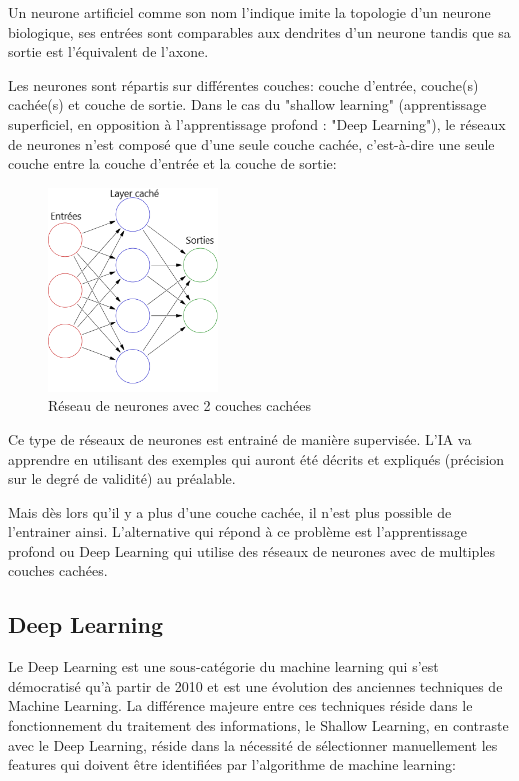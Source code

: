             Un neurone artificiel comme son nom l'indique imite la topologie d'un neurone biologique,
            ses entrées sont comparables aux dendrites d'un neurone tandis que sa
            sortie est l'équivalent de l'axone. \newline

            Les neurones sont répartis sur différentes couches: couche d'entrée, couche(s) cachée(s)
            et couche de sortie. Dans le cas du "shallow learning" (apprentissage superficiel,
            en opposition à l'apprentissage profond : "Deep Learning"), le réseaux de neurones
            n'est composé que d'une seule couche cachée, c'est-à-dire une seule couche entre
            la couche d'entrée et la couche de sortie:

            \begin{figure}[H]
                \centering
                \includegraphics[width=0.4\textwidth]{Images/shallownnoverview}
                \caption{Réseau de neurones avec 2 couches cachées}
                \label{fig:NN2Layers}
            \end{figure}

            Ce type de réseaux de neurones est entrainé de manière supervisée.
            L'IA va apprendre en utilisant des exemples qui auront été décrits
            et expliqués (précision sur le degré de validité) au préalable.

            Mais dès lors qu'il y a plus d'une couche cachée,
            il n'est plus possible de l'entrainer ainsi.
            L'alternative qui répond à ce problème est l'apprentissage profond ou
            Deep Learning qui utilise des réseaux de neurones avec de multiples couches
            cachées.


        \subsection{Deep Learning}
            Le Deep Learning est une sous-catégorie du machine learning qui s'est démocratisé
            qu'à partir de 2010 et est une évolution des anciennes techniques de Machine Learning.
            La différence majeure entre ces techniques réside dans le fonctionnement du traitement des
            informations, le Shallow Learning, en contraste avec le Deep
            Learning, réside dans la nécessité de sélectionner manuellement les features
            qui doivent être identifiées par l'algorithme de machine learning:

